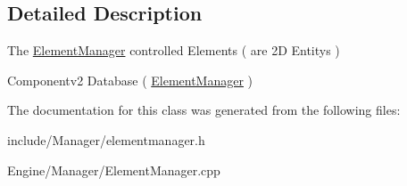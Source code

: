 \subsection{Detailed Description}
The \hyperlink{classEngine_1_1ElementManager}{Element\+Manager} controlled Elements ( are 2\+D Entitys ) 

Componentv2 Database ( \hyperlink{classEngine_1_1ElementManager}{Element\+Manager} ) 

The documentation for this class was generated from the following files\+:\begin{DoxyCompactItemize}
\item 
include/\+Manager/elementmanager.\+h\item 
Engine/\+Manager/Element\+Manager.\+cpp\end{DoxyCompactItemize}
